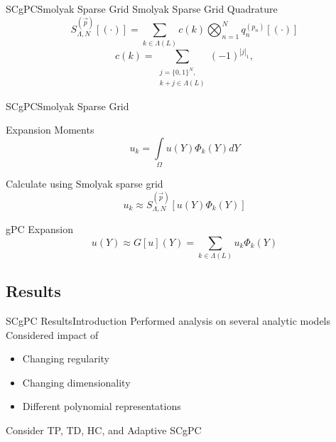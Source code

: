 \documentclass{beamer}
\begin{document}
\begin{frame}{SCgPC}{Smolyak Sparse Grid}%
  Smolyak Sparse Grid Quadrature
  \begin{equation*}
    S^{(\vec p)}_{\Lambda,N}[(\cdot)] = \sum_{k\in\Lambda(L)} c(k)\bigotimes_{n=1}^N
    q^{(p_n)}_n[(\cdot)]
  \end{equation*}
  \begin{equation*}
    c(k) = \sum_{\substack{j=\{0,1\}^N,\\k+j\in\Lambda(L)}} (-1)^{|j|_1},
  \end{equation*}
\end{frame}


\begin{frame}{SCgPC}{Smolyak Sparse Grid}\vspace{-20pt}
  \begin{alertblock}{Expansion Moments}
    \[u_k = \int\limits_\Omega u(Y)\Phi_k(Y) dY\]
  \end{alertblock}
  Calculate using Smolyak sparse grid
  \begin{equation*}
    u_k \approx S^{(\vec p)}_{\Lambda,N}[u(Y)\Phi_k(Y)]
  \end{equation*}
  \begin{block}{gPC Expansion}
    \[u(Y) \approx G[u](Y) = \sum_{k\in\Lambda(L)} u_k \Phi_k(Y)\]
  \end{block}
\end{frame}



\subsection{Results}

\begin{frame}{SCgPC Results}{Introduction}\vspace{-20pt}
  \vfill
Performed analysis on several analytic models
  \vfill
Considered impact of
  \vfill
\begin{itemize}
  \item Changing regularity
  \vfill
  \item Changing dimensionality
  \vfill
  \item Different polynomial representations
\end{itemize}
  \vfill
  Consider TP, TD, HC, and Adaptive SCgPC
  \vfill
\end{frame}
\end{document}
